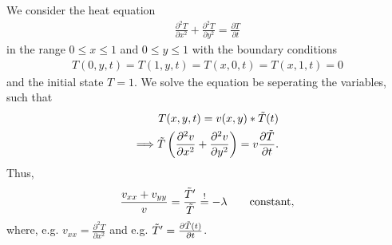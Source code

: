 \documentclass[a4aper,pagesize]{article}
\theoremstyle{definition}
\theoremstyle{plain}
\theoremstyle{remark}
\begin{document}
We consider the heat equation
\begin{align}
    \frac{\partial^2 T}{ \partial x ^2} + \frac{\partial^2 T}{ \partial y ^2} = \frac{\partial T}{ \partial t}
\end{align}
in the range $0 \leq x \leq 1$ and  $0 \leq y \leq 1$ with the boundary conditions
\begin{align}
    T(0,y,t) = T(1, y, t) = T(x, 0, t) = T(x, 1, t) = 0
\end{align}
and the initial state $T =1$. We solve the equation be seperating the variables, such that
\begin{align}
    T(x, y, t) = v(x, y) * \Tilde{T}(t) \\
    \Longrightarrow \Tilde{T}\left(\frac{\partial^2 v}{ \partial x ^2} + \frac{\partial^2 v}{ \partial y ^2}  \right) = v \frac{\partial \Tilde{T}}{ \partial t}.
\end{align}
Thus,
\begin{align}
\frac{v_{xx} + v_{yy}}{v} = \frac{\Tilde{T}'}{\Tilde{T}} \overset{!}{=} -\lambda \quad \quad {\rm constant},
\end{align}
where, e.g.  $v_{xx} = \frac{\partial^2 T}{ \partial x ^2}$ and e.g. $\Tilde{T}' = \frac{\partial \Tilde{T}(t)}{\partial t}$.
\end{document}
